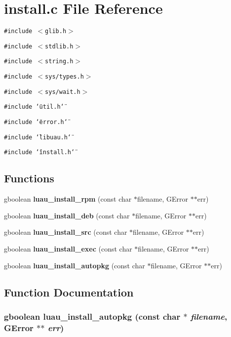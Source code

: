 \section{install.c File Reference}
\label{install_8c}
{\tt \#include $<$glib.h$>$}\par
{\tt \#include $<$stdlib.h$>$}\par
{\tt \#include $<$string.h$>$}\par
{\tt \#include $<$sys/types.h$>$}\par
{\tt \#include $<$sys/wait.h$>$}\par
{\tt \#include \char`\"{}util.h\char`\"{}}\par
{\tt \#include \char`\"{}error.h\char`\"{}}\par
{\tt \#include \char`\"{}libuau.h\char`\"{}}\par
{\tt \#include \char`\"{}install.h\char`\"{}}\par
\subsection*{Functions}
\begin{CompactItemize}
\item 
gboolean {\bf luau\_\-install\_\-rpm} (const char $\ast$filename, GError $\ast$$\ast$err)
\item 
gboolean {\bf luau\_\-install\_\-deb} (const char $\ast$filename, GError $\ast$$\ast$err)
\item 
gboolean {\bf luau\_\-install\_\-src} (const char $\ast$filename, GError $\ast$$\ast$err)
\item 
gboolean {\bf luau\_\-install\_\-exec} (const char $\ast$filename, GError $\ast$$\ast$err)
\item 
gboolean {\bf luau\_\-install\_\-autopkg} (const char $\ast$filename, GError $\ast$$\ast$err)
\end{CompactItemize}


\subsection{Function Documentation}
\subsubsection{\setlength{\rightskip}{0pt plus 5cm}gboolean luau\_\-install\_\-autopkg (const char $\ast$ {\em filename}, GError $\ast$$\ast$ {\em err})}\label{install_8c_a4}




